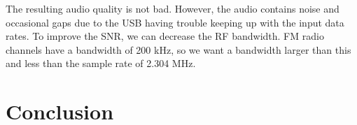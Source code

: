\documentclass{article}
\begin{document}
The resulting audio quality is not bad. However, the audio contains noise and occasional gaps due to the USB having trouble keeping up with the input data rates. To improve the SNR, we can decrease the RF bandwidth. FM radio channels have a bandwidth of 200 kHz, so we want a bandwidth larger than this and less than the sample rate of 2.304 MHz.

\section{Conclusion}

%
%
	
\end{document}
